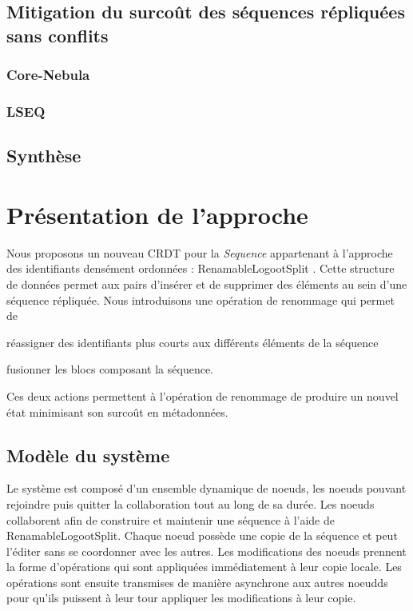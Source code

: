 \documentclass[12pt]{thesul}
\begin{document}
\section{Mitigation du surcoût des séquences répliquées sans conflits}
\subsection{Core-Nebula}
\subsection{LSEQ}


\section{Synthèse}

% 

\NumberThisInToc
\chapter{Présentation de l'approche}
\minitoc

Nous proposons un nouveau \ac{CRDT} pour la \emph{Sequence} appartenant à l'approche des identifiants densément ordonnées : RenamableLogootSplit \cite{nicolas:hal-01932552,nicolas:hal-02526724}.
Cette structure de données permet aux pairs d'insérer et de supprimer des éléments au sein d'une séquence répliquée.
Nous introduisons une opération de renommage qui permet de
\begin{enumerate*}
  \item réassigner des identifiants plus courts aux différents éléments de la séquence
  \item fusionner les blocs composant la séquence.
\end{enumerate*}
Ces deux actions permettent à l'opération de renommage de produire un nouvel état minimisant son surcoût en métadonnées.

\section{Modèle du système}

Le système est composé d'un ensemble dynamique de noeuds, les noeuds pouvant rejoindre puis quitter la collaboration tout au long de sa durée.
Les noeuds collaborent afin de construire et maintenir une séquence à l'aide de RenamableLogootSplit.
Chaque noeud possède une copie de la séquence et peut l'éditer sans se coordonner avec les autres.
Les modifications des noeuds prennent la forme d'opérations qui sont appliquées immédiatement à leur copie locale.
Les opérations sont ensuite transmises de manière asynchrone aux autres noeudds pour qu'ils puissent à leur tour appliquer les modifications à leur copie.
\end{document}
